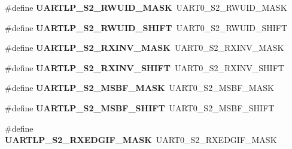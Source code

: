 \begin{DoxyCompactItemize}
\item 
\hypertarget{group___backward___compatibility___symbols_ga467467c8bbe352103ff116334710d766}{}\#define {\bfseries U\+A\+R\+T\+L\+P\+\_\+\+S2\+\_\+\+R\+W\+U\+I\+D\+\_\+\+M\+A\+S\+K}~U\+A\+R\+T0\+\_\+\+S2\+\_\+\+R\+W\+U\+I\+D\+\_\+\+M\+A\+S\+K\label{group___backward___compatibility___symbols_ga467467c8bbe352103ff116334710d766}

\item 
\hypertarget{group___backward___compatibility___symbols_ga21655fc24718467c5c7a3a17491ab20c}{}\#define {\bfseries U\+A\+R\+T\+L\+P\+\_\+\+S2\+\_\+\+R\+W\+U\+I\+D\+\_\+\+S\+H\+I\+F\+T}~U\+A\+R\+T0\+\_\+\+S2\+\_\+\+R\+W\+U\+I\+D\+\_\+\+S\+H\+I\+F\+T\label{group___backward___compatibility___symbols_ga21655fc24718467c5c7a3a17491ab20c}

\item 
\hypertarget{group___backward___compatibility___symbols_ga5851ca00d46976a2bb09420d5ea14ce0}{}\#define {\bfseries U\+A\+R\+T\+L\+P\+\_\+\+S2\+\_\+\+R\+X\+I\+N\+V\+\_\+\+M\+A\+S\+K}~U\+A\+R\+T0\+\_\+\+S2\+\_\+\+R\+X\+I\+N\+V\+\_\+\+M\+A\+S\+K\label{group___backward___compatibility___symbols_ga5851ca00d46976a2bb09420d5ea14ce0}

\item 
\hypertarget{group___backward___compatibility___symbols_gafad67c9021f86de6c0d08f8c72457a26}{}\#define {\bfseries U\+A\+R\+T\+L\+P\+\_\+\+S2\+\_\+\+R\+X\+I\+N\+V\+\_\+\+S\+H\+I\+F\+T}~U\+A\+R\+T0\+\_\+\+S2\+\_\+\+R\+X\+I\+N\+V\+\_\+\+S\+H\+I\+F\+T\label{group___backward___compatibility___symbols_gafad67c9021f86de6c0d08f8c72457a26}

\item 
\hypertarget{group___backward___compatibility___symbols_ga41b1656314af8d525f36c119201f43a6}{}\#define {\bfseries U\+A\+R\+T\+L\+P\+\_\+\+S2\+\_\+\+M\+S\+B\+F\+\_\+\+M\+A\+S\+K}~U\+A\+R\+T0\+\_\+\+S2\+\_\+\+M\+S\+B\+F\+\_\+\+M\+A\+S\+K\label{group___backward___compatibility___symbols_ga41b1656314af8d525f36c119201f43a6}

\item 
\hypertarget{group___backward___compatibility___symbols_ga2bfcba2957fb07036e3f1aaacebcfa1a}{}\#define {\bfseries U\+A\+R\+T\+L\+P\+\_\+\+S2\+\_\+\+M\+S\+B\+F\+\_\+\+S\+H\+I\+F\+T}~U\+A\+R\+T0\+\_\+\+S2\+\_\+\+M\+S\+B\+F\+\_\+\+S\+H\+I\+F\+T\label{group___backward___compatibility___symbols_ga2bfcba2957fb07036e3f1aaacebcfa1a}

\item 
\hypertarget{group___backward___compatibility___symbols_ga3ff5db6c0a297c27ffc6435304503f4d}{}\#define {\bfseries U\+A\+R\+T\+L\+P\+\_\+\+S2\+\_\+\+R\+X\+E\+D\+G\+I\+F\+\_\+\+M\+A\+S\+K}~U\+A\+R\+T0\+\_\+\+S2\+\_\+\+R\+X\+E\+D\+G\+I\+F\+\_\+\+M\+A\+S\+K\label{group___backward___compatibility___symbols_ga3ff5db6c0a297c27ffc6435304503f4d}


\end{DoxyCompactItemize}
